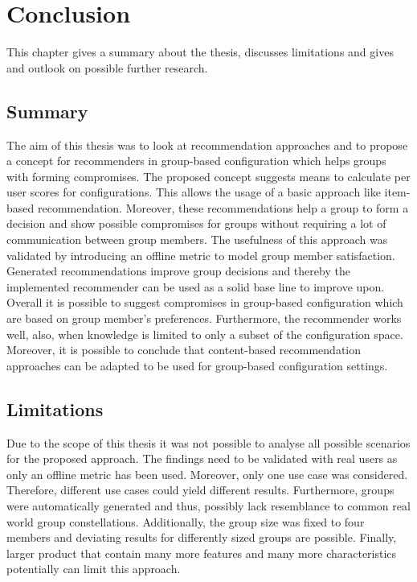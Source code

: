 \chapter{Conclusion}
\label{ch:Conclusion}

This chapter gives a summary about the thesis, discusses limitations and gives and outlook on possible further research.


\section{Summary}
\label{sec:Conclusion:Summary}

The aim of this thesis was to look at recommendation approaches and to propose a concept for recommenders in group-based configuration which helps groups with forming compromises. The proposed concept suggests means to calculate per user scores for configurations. This allows the usage of a basic approach like item-based recommendation. Moreover, these recommendations help a group to form a decision and show possible compromises for groups without requiring a lot of communication between group members. The usefulness of this approach was validated by introducing an offline metric to model group member satisfaction. Generated recommendations improve group decisions and thereby the implemented recommender can be used as a solid base line to improve upon. 
Overall it is possible to suggest compromises in group-based configuration which are based on group member's preferences. Furthermore, the recommender works well, also, when knowledge is limited to only a subset of the configuration space. Moreover, it is possible to conclude that content-based recommendation approaches can be adapted to be used for group-based configuration settings.

\section{Limitations}
\label{sec:Conclusion:Limitations}

Due to the scope of this thesis it was not possible to analyse all possible scenarios for the proposed approach. The findings need to be validated with real users as only an offline metric has been used. Moreover, only one use case was considered. Therefore, different use cases could yield different results. Furthermore, groups were automatically generated and thus, possibly lack resemblance to common real world group constellations. Additionally, the group size was fixed to four members and deviating results for differently sized groups are possible. Finally, larger product that contain many more features and many more characteristics potentially can limit this approach.

